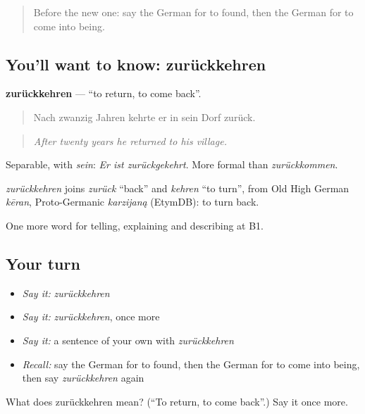 \label{lesson:GE-C321-zurueckkehren}



\begin{quote}
Before the new one: say the German for to found, then the German for to come into being.
\end{quote}

\subsection*{You'll want to know: zurückkehren}
\textbf{zurückkehren} — \textquotedblleft{}to return, to come back\textquotedblright{}.

\begin{quote}
Nach zwanzig Jahren kehrte er in sein Dorf zurück.
\end{quote}

\begin{quote}
\emph{After twenty years he returned to his village.}
\end{quote}

Separable, with \emph{sein}: \emph{Er ist zurückgekehrt}. More formal than \emph{zurückkommen}.

\begin{cousinweb}
\emph{zurückkehren} joins \emph{zurück} \textquotedblleft{}back\textquotedblright{} and \emph{kehren} \textquotedblleft{}to turn\textquotedblright{}, from Old High German \emph{kēran}, Proto-Germanic \emph{karzijaną} (EtymDB): to turn back.
\end{cousinweb}

\begin{grammarlens}[title={What you've built}]
One more word for telling, explaining and describing at B1.
\end{grammarlens}

\subsection*{Your turn}
\begin{itemize}
\raggedright
  \item \emph{Say it:} \emph{zurückkehren}
  \item \emph{Say it:} \emph{zurückkehren}, once more
  \item \emph{Say it:} a sentence of your own with \emph{zurückkehren}
  \item \emph{Recall:} say the German for to found, then the German for to come into being, then say \emph{zurückkehren} again
\end{itemize}

\begin{tcolorbox}[breakable,colback=teal!4,colframe=teal!35!black,title={Before you move on}]
What does zurückkehren mean? (\textquotedblleft{}To return, to come back\textquotedblright{}.) Say it once more.
\end{tcolorbox}
